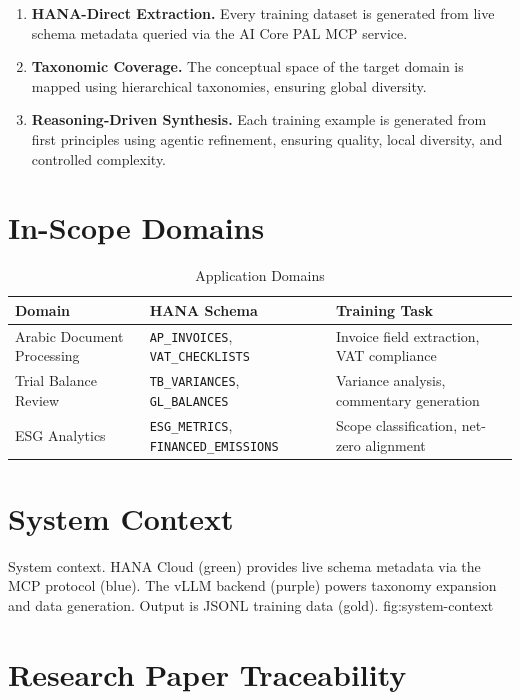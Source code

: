 \begin{enumerate}[nosep]
    \item \textbf{HANA-Direct Extraction.} Every training dataset is generated from live
          schema metadata queried via the AI Core PAL MCP service.
    \item \textbf{Taxonomic Coverage.} The conceptual space of the target domain is mapped
          using hierarchical taxonomies, ensuring global diversity.
    \item \textbf{Reasoning-Driven Synthesis.} Each training example is generated from
          first principles using agentic refinement, ensuring quality, local diversity,
          and controlled complexity.
\end{enumerate}

\section{In-Scope Domains}

\begin{table}[H]
\centering
\caption{Application Domains}
\label{tab:domains}
\begin{tabularx}{\textwidth}{llX}
\toprule
\textbf{Domain} & \textbf{HANA Schema} & \textbf{Training Task} \\
\midrule
Arabic Document Processing & \texttt{AP\_INVOICES}, \texttt{VAT\_CHECKLISTS} & Invoice field extraction, VAT compliance \\
Trial Balance Review & \texttt{TB\_VARIANCES}, \texttt{GL\_BALANCES} & Variance analysis, commentary generation \\
ESG Analytics & \texttt{ESG\_METRICS}, \texttt{FINANCED\_EMISSIONS} & Scope classification, net-zero alignment \\
\bottomrule
\end{tabularx}
\end{table}

\section{System Context}

%
  {System context. HANA Cloud (green) provides live schema metadata via the MCP
    protocol (blue). The vLLM backend (purple) powers taxonomy expansion and data
    generation. Output is JSONL training data (gold).}%
  {fig:system-context}

\section{Research Paper Traceability}

